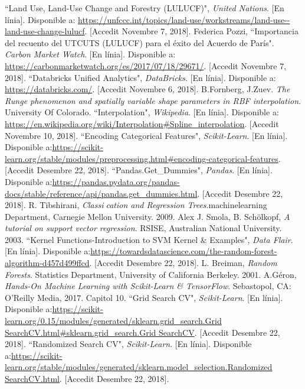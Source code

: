 \documentclass[10pt,a4paper,twocolumn,twoside]{article}
\begin{document}
\begin{thebibliography}{11}
 ``Land Use, Land-Use Change and Forestry (LULUCF)", \textit{United Nations}. [En línia]. Disponible a: \url{ https://unfccc.int/topics/land-use/workstreams/land-use--land-use-change-lulucf}. [Accedit Novembre 7, 2018].
Federica Pozzi, ``Importancia del recuento del UTCUTS (LULUCF) para el éxito del Acuerdo de París". \textit{Carbon Market Watch}. [En línia]. Disponible a: \url{https://carbonmarketwatch.org/es/2017/07/18/29671/}. [Accedit Novembre 7, 2018].
``Databricks Unified Analytics", \textit{DataBricks}. [En línia]. Disponible a: \url{https://databricks.com/}. [Accedit Novembre 6, 2018].
B.Fornberg, J.Zuev. \textit{The Runge phenomenon and spatially variable shape parameters in RBF interpolation}. University Of Colorado.
 ``Interpolation", \textit{Wikipedia}. [En línia]. Disponible a: \url{https://en.wikipedia.org/wiki/Interpolation#Spline_interpolation}. [Accedit Novembre 10, 2018].
``Encoding Categorical Features", \textit{Scikit-Learn}. [En línia]. Disponible a:\url{https://scikit-learn.org/stable/modules/preprocessing.html#encoding-categorical-features}. [Accedit Desembre 22, 2018].
``Pandas.Get\_Dummies", \textit{Pandas}. [En línia]. Disponible a:\url{https://pandas.pydata.org/pandas-docs/stable/reference/api/pandas.get_dummies.html}. [Accedit Desembre 22, 2018].
R. Tibshirani, \textit{Classication and Regression Trees}.machinelearning Department, Carnegie Mellon University. 2009.
Alex J. Smola, B. Schölkopf, \textit{A tutorial on support vector regression}. RSISE, Australian National University. 2003.
``Kernel Functions-Introduction to SVM Kernel \& Examples", \textit{Data Flair}. [En línia]. Disponible a:\url{https://towardsdatascience.com/the-random-forest-algorithm-d457d499ffcd}. [Accedit Desembre 22, 2018].
L. Breiman, \textit{Random Forests}. Statistics Department, University of California Berkeley. 2001.
A.Géron, \textit{Hands-On Machine Learning with Scikit-Learn \& TensorFlow}. Sebastopol, CA: O’Reilly Media, 2017. Capitol 10.
``Grid Search CV", \textit{Scikit-Learn}. [En línia]. Disponible a:\url{https://scikit-learn.org/0.15/modules/generated/sklearn.grid_search.Grid SearchCV.html#sklearn.grid_search.Grid SearchCV}. [Accedit Desembre 22, 2018].
``Randomized Search CV", \textit{Scikit-Learn}. [En línia]. Disponible a:\url{https://scikit-learn.org/stable/modules/generated/sklearn.model_selection.Randomized SearchCV.html}. [Accedit Desembre 22, 2018].

\end{thebibliography}
\clearpage
\end{document}

